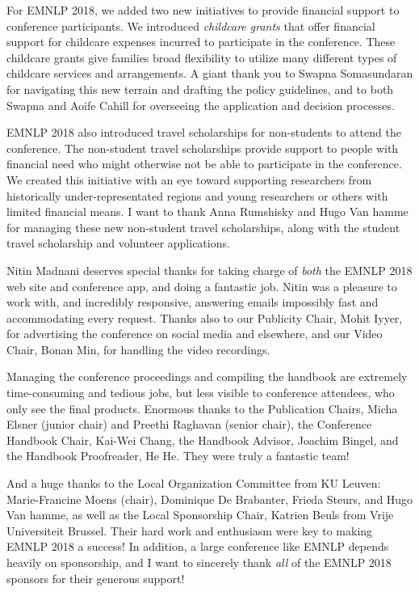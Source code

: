For EMNLP 2018, we added two new initiatives to provide financial
support to conference participants.  We introduced {\it childcare
  grants} that offer financial support for childcare expenses incurred
to participate in the conference. These childcare grants give families
broad flexibility to utilize many different types of childcare
services and arrangements. A giant thank you to Swapna Somasundaran
for  navigating this new terrain and drafting the policy guidelines,
and to both Swapna and Aoife Cahill for overseeing the application and
decision processes.

EMNLP 2018 also introduced travel scholarships for non-students to
attend the conference. The non-student travel scholarships provide
support to people with financial need who might otherwise not be able
to participate in the conference. We created this initiative with an
eye toward supporting researchers from historically
under-representated regions and young researchers or others with
limited financial means. I want to thank Anna Rumshisky and Hugo Van
hamme for managing these new non-student travel scholarships, along
with the student travel scholarship and volunteer applications.

Nitin Madnani deserves special thanks for taking charge of {\it both}
the EMNLP 2018 web site and conference app, and doing a fantastic
job. Nitin was a pleasure to work with, and incredibly responsive,
answering emails impossibly fast and accommodating every
request. Thanks also to our Publicity Chair, Mohit Iyyer, for
advertising the conference on social media and elsewhere, and our
Video Chair, Bonan Min, for handling the video recordings.

Managing the conference proceedings and compiling the handbook are
extremely time-consuming and tedious jobs, but less visible to conference
attendees, who only see the final products. Enormous thanks to the
Publication Chairs, Micha Elsner (junior chair) and Preethi Raghavan
(senior chair), the Conference Handbook Chair, Kai-Wei Chang, the
Handbook Advisor, Joachim Bingel, and the Handbook Proofreader, He
He. They were truly a fantastic team!

And a huge thanks to the Local Organization Committee from KU Leuven:
Marie-Francine Moens (chair), Dominique De Brabanter, Frieda Steurs,
and Hugo Van hamme, as well as the Local Sponsorship Chair, Katrien
Beuls from Vrije Universiteit Brussel. Their hard work and enthusiasm
were key to making EMNLP 2018 a success! In addition, a large
conference like EMNLP depends heavily on sponsorship, and I want to
sincerely thank {\it all} of the EMNLP 2018 sponsors for their
generous support!

